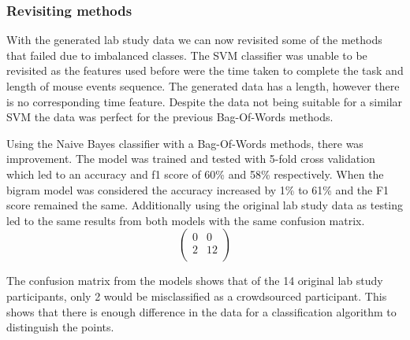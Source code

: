 \documentclass{article}
\begin{document}
\subsubsection{Revisiting methods}





With the generated lab study data we can now revisited some of the methods that failed due to imbalanced classes.
The SVM classifier was unable to be revisited as the features used before were the time taken to complete the task and length of mouse events sequence.
The generated data has a length, however there is no corresponding time feature.
Despite the data not being suitable for a similar SVM the data was perfect for the previous Bag-Of-Words methods.

Using the Naive Bayes classifier with a Bag-Of-Words methods, there was improvement.
The model was trained and tested with 5-fold cross validation which led to an accuracy and f1 score of 60\% and 58\% respectively.
When the bigram model was considered the accuracy increased by 1\% to 61\% and the F1 score remained the same. %
Additionally using the original lab study data as testing led to the same results from both models with the same confusion matrix.
\[    %
\begin{pmatrix}
    0 & 0 \\
    2 & 12 \\
\end{pmatrix}
\]    %

The confusion matrix from the models shows that of the 14 original lab study participants, only 2 would be misclassified as a crowdsourced participant.
This shows that there is enough difference in the data for a classification algorithm to distinguish the points. 
\end{document}
